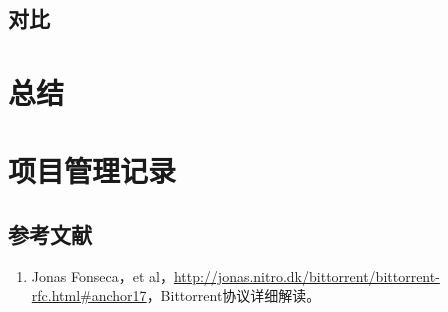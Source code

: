 \documentclass[15pt]{ctexart}
\begin{document}
\subsection{对比} %
\label{sub:对比}


\section{总结} %
\label{sec:总结}


\section{项目管理记录} %
\label{sec:项目管理记录}


\newpage
\appendixpage
\begin{appendices}
	\section{参考文献} %
	\begin{enumerate}
		\item 	Jonas Fonseca，et al，\url{http://jonas.nitro.dk/bittorrent/bittorrent-rfc.html#anchor17}，Bittorrent协议详细解读。
	\end{enumerate}
\end{appendices}
\end{document}
